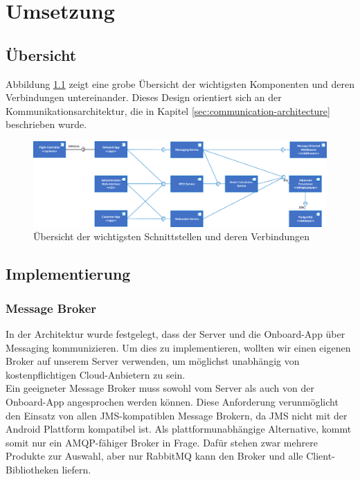 \newpage
\chapter{Umsetzung}

\section{Übersicht}

Abbildung \ref{fig:component-overview} zeigt eine grobe Übersicht der wichtigsten Komponenten und deren Verbindungen untereinander. Dieses Design orientiert sich an der Kommunikationsarchitektur, die in Kapitel \ref{sec:communication-architecture} beschrieben wurde.

\begin{figure}[H]
	\includegraphics[width=1.0\textwidth]{images/component-overview.pdf}
	\caption{Übersicht der wichtigsten Schnittstellen und deren Verbindungen }
	\label{fig:component-overview}
\end{figure}
\section{Implementierung}

\subsection{Message Broker}
In der Architektur wurde festgelegt, dass der Server und die Onboard-App über Messaging kommunizieren. Um dies zu implementieren, wollten wir einen eigenen Broker auf unserem Server verwenden, um möglichst unabhängig von kostenpflichtigen Cloud-Anbietern zu sein. \\

Ein geeigneter Message Broker muss sowohl vom Server als auch von der Onboard-App angesprochen werden können. Diese Anforderung verunmöglicht den Einsatz von allen \Gls{JMS}-kompatiblen Message Brokern, da \Gls{JMS} nicht mit der Android Plattform kompatibel ist. Als plattformunabhängige Alternative, kommt somit nur ein \Gls{AMQP}-fähiger Broker in Frage. Dafür stehen zwar mehrere Produkte zur Auswahl, aber nur RabbitMQ kann den Broker und alle Client-Bibliotheken liefern.\\

